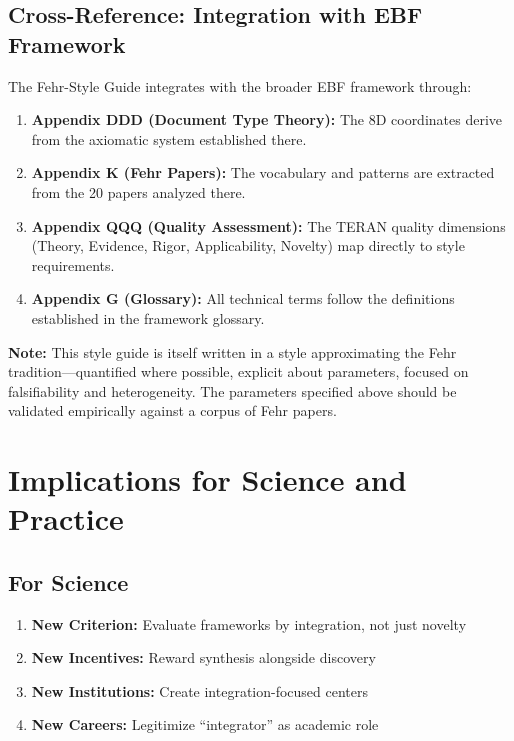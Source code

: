 \subsection{Cross-Reference: Integration with EBF Framework}

The Fehr-Style Guide integrates with the broader EBF framework through:

\begin{enumerate}
\item \textbf{Appendix DDD (Document Type Theory):} The 8D coordinates
      derive from the axiomatic system established there.

\item \textbf{Appendix K (Fehr Papers):} The vocabulary and patterns
      are extracted from the 20 papers analyzed there.

\item \textbf{Appendix QQQ (Quality Assessment):} The TERAN quality
      dimensions (Theory, Evidence, Rigor, Applicability, Novelty)
      map directly to style requirements.

\item \textbf{Appendix G (Glossary):} All technical terms follow the
      definitions established in the framework glossary.
\end{enumerate}

\textbf{Note:} This style guide is itself written in a style approximating
the Fehr tradition---quantified where possible, explicit about parameters,
focused on falsifiability and heterogeneity. The parameters specified above
should be validated empirically against a corpus of Fehr papers.



\section{Implications for Science and Practice}
\label{sec:meta-implications}

\subsection{For Science}

\begin{enumerate}
\item \textbf{New Criterion:} Evaluate frameworks by integration, not just novelty
\item \textbf{New Incentives:} Reward synthesis alongside discovery
\item \textbf{New Institutions:} Create integration-focused centers
\item \textbf{New Careers:} Legitimize ``integrator'' as academic role
\end{enumerate}

